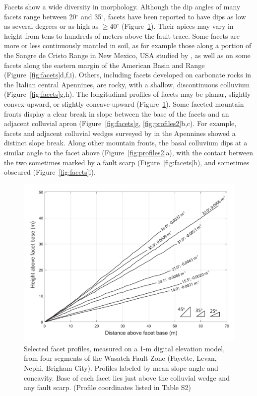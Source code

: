 Facets show a wide diversity in morphology. Although the dip angles of many facets range between 20$^\circ$ and 35$^\circ$, facets have been reported to have dips as low as several degrees \citep[e.g.,][]{menges1990soils} or as high as $\ge40^\circ$ \citep[e.g.,][]{wilkinson2015slip} (Figure~\ref{fig:profiles1}). Their apices may vary in height from tens to hundreds of meters above the fault trace. Some facets are more or less continuously mantled in soil, as for example those along a portion of the Sangre de Cristo Range in New Mexico, USA studied by \citet{menges1990soils}, as well as on some facets along the eastern margin of the American Basin and Range (Figure~\ref{fig:facets}d,f,i). Others, including facets developed on carbonate rocks in the Italian central Apennines, are rocky, with a shallow, discontinuous colluvium \citep{tucker2011geomorphic} (Figure~\ref{fig:facets}g,h). The longitudinal profiles of facets may be planar, slightly convex-upward, or slightly concave-upward (Figure~\ref{fig:profiles1}). Some faceted mountain fronts display a clear break in slope between the base of the facets and an adjacent colluvial apron (Figure~\ref{fig:facets}g, \ref{fig:profiles2}b,c). For example, facets and adjacent colluvial wedges surveyed by \citet{bubeck2015tectonic} in the Apennines showed a distinct slope break. Along other mountain fronts, the basal colluvium dips at a similar angle to the facet above (Figure~\ref{fig:profiles2}a), with the contact between the two sometimes marked by a fault scarp (Figure~\ref{fig:facets}h), and sometimes obscured (Figure~\ref{fig:facets}i).

\begin{figure}[ht!]
\centerline{\includegraphics[width=6in]{figure2.pdf}}
\caption{Selected facet profiles, measured on a 1-m  digital elevation model, from four segments of the
Wasatch Fault Zone (Fayette, Levan, Nephi, Brigham City). Profiles
labeled by mean slope angle and concavity. Base of each facet lies just 
above the colluvial wedge and any fault scarp. (Profile coordinates listed in Table S2)}
\label{fig:profiles1}
\end{figure}

